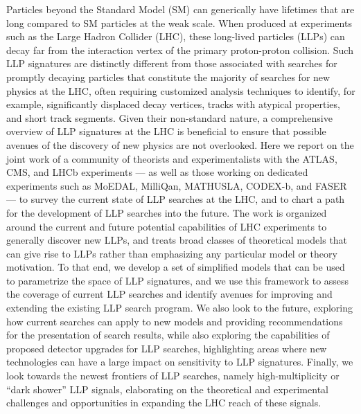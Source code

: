 Particles beyond the Standard Model (SM) can generically have lifetimes that are long compared to SM particles at the weak scale.
When produced at experiments such as the Large Hadron Collider (LHC), these long-lived particles (LLPs) can decay far from the interaction vertex of the primary proton-proton collision.
Such LLP signatures are distinctly different from those associated with searches for promptly decaying particles that constitute the majority of searches for new physics at the LHC, often requiring customized analysis techniques to identify, for example, significantly displaced decay vertices, tracks with atypical properties, and short track segments.
Given their non-standard nature, a comprehensive overview of LLP signatures at the LHC is beneficial to ensure that possible avenues of the discovery of new physics are not overlooked.
Here we report on the joint work of a community of theorists and experimentalists with the ATLAS, CMS, and LHCb experiments --- as well as those working on dedicated experiments such as MoEDAL, MilliQan, MATHUSLA, CODEX-b, and FASER --- to survey the current state of LLP searches at the LHC, and to chart a path for the development of LLP searches into the future.
The work is organized around the current and future potential capabilities of LHC experiments to generally discover new LLPs, and treats broad classes of theoretical models that can give rise to LLPs rather than emphasizing any particular model or theory motivation.
To that end, we develop a set of simplified models that can be used to parametrize the space of LLP signatures, and we use this framework to assess the coverage of current LLP searches and identify avenues for improving and extending the existing LLP search program.
We also look to the future, exploring how current searches can apply to new models and providing recommendations for the presentation of search results, while also exploring the capabilities of proposed detector upgrades for LLP searches, highlighting areas where new technologies can have a large impact on sensitivity to LLP signatures.
Finally, we look towards the newest frontiers of LLP searches, namely high-multiplicity or ``dark shower'' LLP signals, elaborating on the theoretical and experimental challenges and opportunities in expanding the LHC reach of these signals.
